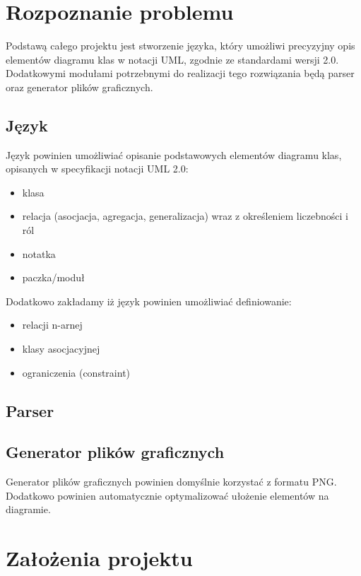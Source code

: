\documentclass[a4paper,11pt,title]{report}
\begin{document}
\section{Rozpoznanie problemu}
Podstawą całego projektu jest stworzenie języka, który umożliwi precyzyjny opis elementów diagramu
klas w notacji UML, zgodnie ze standardami wersji 2.0.
Dodatkowymi modułami potrzebnymi do realizacji tego rozwiązania będą parser oraz generator plików
graficznych.

\subsection{Język}
Język powinien umożliwiać opisanie podstawowych elementów diagramu klas, opisanych w specyfikacji
notacji UML 2.0:
\begin{itemize}
\item{klasa}
\item{relacja (asocjacja, agregacja, generalizacja) wraz z określeniem liczebności i ról}
\item{notatka}
\item{paczka/moduł}
\end{itemize}
Dodatkowo zakładamy iż język powinien umożliwiać definiowanie:
\begin{itemize}
\item{relacji n-arnej}
\item{klasy asocjacyjnej}
\item{ograniczenia (constraint)}
\end{itemize}

\subsection{Parser}

\subsection{Generator plików graficznych}
Generator plików graficznych powinien domyślnie korzystać z formatu PNG. Dodatkowo powinien
automatycznie optymalizować ułożenie elementów na diagramie. 

\section{Założenia projektu}
\end{document}
